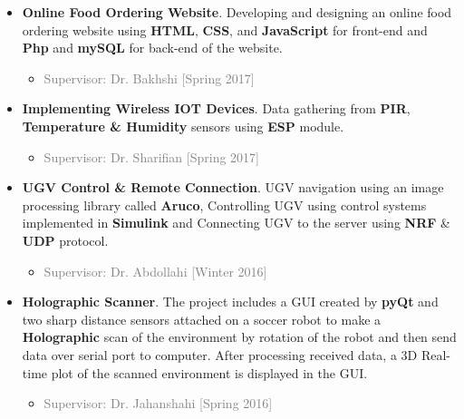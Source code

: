 \documentclass[10pt,a4paper,sans]{moderncv} %
\begin{document}
\begin{itemize}

\item \textbf{Online Food Ordering Website}. Developing and designing an online food ordering website using \textbf{HTML}, \textbf{CSS}, and \textbf{JavaScript} for front-end and \textbf{Php} and \textbf{mySQL} for back-end of the website.
\begin{itemize}
	\item \textcolor{gray}{Supervisor: Dr. Bakhshi [Spring 2017]}
	\newline
\end{itemize}

\item \textbf{Implementing Wireless IOT Devices}. Data gathering from \textbf{PIR}, \textbf{Temperature \& Humidity} sensors using \textbf{ESP} module.
\begin{itemize}
	\item \textcolor{gray}{Supervisor: Dr. Sharifian [Spring 2017]}
	\newline
\end{itemize}

\item \textbf{UGV Control \& Remote Connection}. UGV navigation using an image processing library called \textbf{Aruco}, Controlling UGV using control systems implemented in \textbf{Simulink} and Connecting UGV to the server using \textbf{NRF} \& \textbf{UDP} protocol.
\begin{itemize}
	\item \textcolor{gray}{Supervisor: Dr. Abdollahi [Winter 2016]}
	\newline
\end{itemize}

\item \textbf{Holographic Scanner}. The project includes a GUI created by \textbf{pyQt} and two sharp distance sensors attached on a soccer robot to make a \textbf{Holographic} scan of the environment by rotation of the robot and then send data over serial port to computer. After processing received data, a 3D Real-time plot of the scanned environment is displayed in the GUI.
\begin{itemize}
	\item \textcolor{gray}{Supervisor: Dr. Jahanshahi [Spring 2016]}
	\newline
\end{itemize}

\end{itemize}
\end{document}
